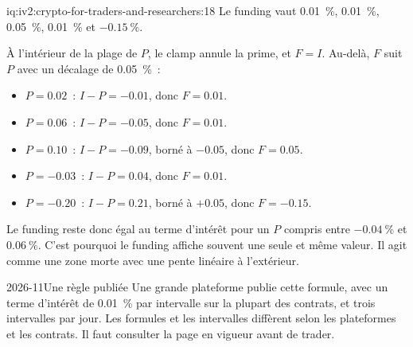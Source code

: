 \begin{solution}{iq:iv2:crypto-for-traders-and-researchers:18}
Le funding vaut 0.01~\%, 0.01~\%, 0.05~\%, 0.01~\% et $-0.15~\%$.

À l'intérieur de la plage de $P$, le clamp annule la prime, et $F = I$. Au-delà, $F$ suit $P$ avec un décalage de 0.05~\%~:
\begin{itemize}
\item $P = 0.02$~: $I - P = -0.01$, donc $F = 0.01$.
\item $P = 0.06$~: $I - P = -0.05$, donc $F = 0.01$.
\item $P = 0.10$~: $I - P = -0.09$, borné à $-0.05$, donc $F = 0.05$.
\item $P = -0.03$~: $I - P = 0.04$, donc $F = 0.01$.
\item $P = -0.20$~: $I - P = 0.21$, borné à $+0.05$, donc $F = -0.15$.
\end{itemize}

Le funding reste donc égal au terme d'intérêt pour un $P$ compris entre $-0.04~\%$ et $0.06~\%$. C'est pourquoi le funding affiche souvent une seule et même valeur. Il agit comme une zone morte avec une pente linéaire à l'extérieur.

\begin{dated}{2026-11}{Une règle publiée}\label{dat:iv2:crypto-for-traders-and-researchers:funding}
Une grande plateforme publie cette formule, avec un terme d'intérêt de 0.01~\% par intervalle sur la plupart des contrats, et trois intervalles par jour. Les formules et les intervalles diffèrent selon les plateformes et les contrats. Il faut consulter la page en vigueur avant de trader.
\end{dated}

\end{solution}

